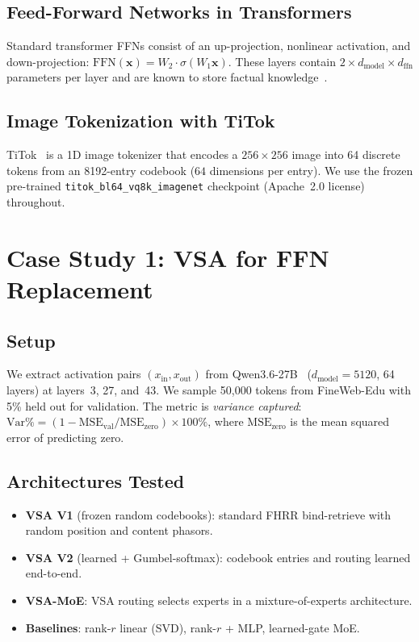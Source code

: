 \documentclass{article}
\begin{document}
\subsection{Feed-Forward Networks in Transformers}

Standard transformer FFNs consist of an up-projection, nonlinear activation, and down-projection: $\text{FFN}(\mathbf{x}) = W_2 \cdot \sigma(W_1 \mathbf{x})$.
These layers contain $2 \times d_\text{model} \times d_\text{ffn}$ parameters per layer and are known to store factual knowledge~\citep{sukhbaatar2019augmenting}.

\subsection{Image Tokenization with TiTok}

TiTok~\citep{yu2024image} is a 1D image tokenizer that encodes a $256{\times}256$ image into 64 discrete tokens from an 8192-entry codebook ($64$ dimensions per entry).
We use the frozen pre-trained \texttt{titok\_bl64\_vq8k\_imagenet} checkpoint (Apache~2.0 license) throughout.

\section{Case Study 1: VSA for FFN Replacement}
\label{sec:ffn}

\subsection{Setup}

We extract activation pairs $(x_\text{in}, x_\text{out})$ from Qwen3.6-27B~\citep{qwen2025} ($d_\text{model}{=}5120$, 64 layers) at layers~3, 27, and~43.
We sample 50{,}000 tokens from FineWeb-Edu with 5\% held out for validation.
The metric is \emph{variance captured}: $\text{Var}\% = (1 - \text{MSE}_\text{val} / \text{MSE}_\text{zero}) \times 100\%$, where $\text{MSE}_\text{zero}$ is the mean squared error of predicting zero.

\subsection{Architectures Tested}

\begin{itemize}[leftmargin=*]
\item \textbf{VSA V1} (frozen random codebooks): standard FHRR bind-retrieve with random position and content phasors.
\item \textbf{VSA V2} (learned + Gumbel-softmax): codebook entries and routing learned end-to-end.
\item \textbf{VSA-MoE}: VSA routing selects experts in a mixture-of-experts architecture.
\item \textbf{Baselines}: rank-$r$ linear (SVD), rank-$r$ + MLP, learned-gate MoE.
\end{itemize}
\end{document}
